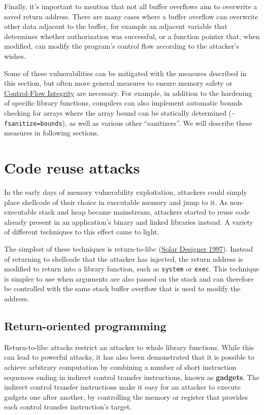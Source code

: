\documentclass[
  a4paper,
]{report}
\begin{document}
Finally, it's important to mention that not all buffer overflows aim to
overwrite a saved return address. There are many cases where a buffer
overflow can overwrite other data adjacent to the buffer, for example an
adjacent variable that determines whether authorization was successful,
or a function pointer that, when modified, can modify the program's
control flow according to the attacker's wishes.

Some of these vulnerabilities can be mitigated with the measures
described in this section, but often more general measures to ensure
memory safety or \protect\hyperlink{cfi}{Control-Flow Integrity} are
necessary. For example, in addition to the hardening of specific library
functions, compilers can also implement automatic bounds checking for
arrays where the array bound can be statically determined
(\texttt{-fsanitize=bounds}), as well as various other ``sanitizers''.
We will describe these measures in following sections.

\hypertarget{code-reuse-attacks}{%
\section{Code reuse attacks}\label{code-reuse-attacks}}

In the early days of memory vulnerability exploitation, attackers could
simply place shellcode of their choice in executable
memory and jump to it. As non-executable stack and heap became
mainstream, attackers started to reuse code already present in an
application's binary and linked libraries instead. A variety of
different techniques to this effect came to light.

The simplest of these techniques is return-to-libc
(\protect\hyperlink{ref-Solar1997}{Solar Designer 1997}). Instead of
returning to shellcode that the attacker has injected, the return
address is modified to return into a library function, such as
\texttt{system} or \texttt{exec}. This technique is simpler to use when
arguments are also passed on the stack and can therefore be controlled
with the same stack buffer overflow that is used to modify the address.

\hypertarget{return-oriented-programming}{%
\subsection{Return-oriented
programming}\label{return-oriented-programming}}

Return-to-libc attacks restrict an attacker to whole library functions.
While this can lead to powerful attacks, it has also been demonstrated
that it is possible to achieve arbitrary computation by combining a
number of short instruction sequences ending in indirect control
transfer instructions, known as \textbf{gadgets}. The
indirect control transfer instructions make it easy for an attacker to
execute gadgets one after another, by controlling the memory or register
that provides each control transfer instruction's target.
\end{document}
